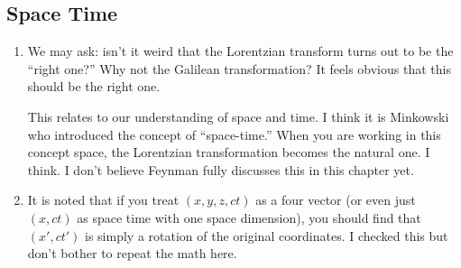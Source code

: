 \subsection{Space Time}

\begin{enumerate}

  \item We may ask: isn't it weird that the Lorentzian transform turns
  out to be the ``right one?'' Why not the Galilean transformation? It
  feels obvious that this should be the right one.

  This relates to our understanding of space and time. I think it is
  Minkowski who introduced the concept of ``space-time.'' When you are
  working in this concept space, the Lorentzian transformation becomes
  the natural one. I think. I don't believe Feynman fully discusses this
  in this chapter yet.

  \item It is noted that if you treat $(x, y, z, ct)$ as a four vector
  (or even just $(x, ct)$ as space time with one space dimension), you
  should find that $(x', ct')$ is simply a rotation of the original
  coordinates. I checked this but don't bother to repeat the math here.

\end{enumerate}
